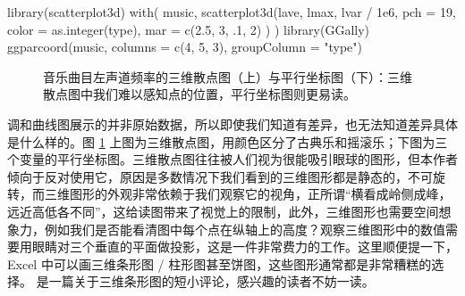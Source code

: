 \documentclass[
  b5paper,
  UTF8,twoside]{book}
\newenvironment{Shaded}{\begin{snugshade}}{\end{snugshade}}
\newcommand{\AttributeTok}[1]{\textcolor[rgb]{0.77,0.63,0.00}{#1}}
\newcommand{\DecValTok}[1]{\textcolor[rgb]{0.00,0.00,0.81}{#1}}
\newcommand{\FloatTok}[1]{\textcolor[rgb]{0.00,0.00,0.81}{#1}}
\newcommand{\FunctionTok}[1]{\textcolor[rgb]{0.00,0.00,0.00}{#1}}
\newcommand{\NormalTok}[1]{#1}
\newcommand{\SpecialCharTok}[1]{\textcolor[rgb]{0.00,0.00,0.00}{#1}}
\newcommand{\StringTok}[1]{\textcolor[rgb]{0.31,0.60,0.02}{#1}}
\begin{document}
\begin{Shaded}
\begin{Highlighting}[]
\FunctionTok{library}\NormalTok{(scatterplot3d)}
\FunctionTok{with}\NormalTok{(}
\NormalTok{  music,}
  \FunctionTok{scatterplot3d}\NormalTok{(lave, lmax, lvar }\SpecialCharTok{/} \FloatTok{1e6}\NormalTok{,}
    \AttributeTok{pch =} \DecValTok{19}\NormalTok{,}
    \AttributeTok{color =} \FunctionTok{as.integer}\NormalTok{(type), }\AttributeTok{mar =} \FunctionTok{c}\NormalTok{(}\FloatTok{2.5}\NormalTok{, }\DecValTok{3}\NormalTok{, .}\DecValTok{1}\NormalTok{, }\DecValTok{2}\NormalTok{)}
\NormalTok{  )}
\NormalTok{)}
\FunctionTok{library}\NormalTok{(GGally)}
\FunctionTok{ggparcoord}\NormalTok{(music, }\AttributeTok{columns =} \FunctionTok{c}\NormalTok{(}\DecValTok{4}\NormalTok{, }\DecValTok{5}\NormalTok{, }\DecValTok{3}\NormalTok{), }\AttributeTok{groupColumn =} \StringTok{"type"}\NormalTok{)}
\end{Highlighting}
\end{Shaded}

\begin{figure}

{\centering {}\newline{}

}

\caption[ 音乐曲目左声道频率的三维散点图与平行坐标图 ]{音乐曲目左声道频率的三维散点图（上）与平行坐标图（下）：三维散点图中我们难以感知点的位置，平行坐标图则更易读。}\label{fig:music-3d-pcp}
\end{figure}



调和曲线图展示的并非原始数据，所以即使我们知道有差异，也无法知道差异具体是什么样的。图 \ref{fig:music-3d-pcp} 上图为三维散点图，用颜色区分了古典乐和摇滚乐；下图为三个变量的平行坐标图。三维散点图往往被人们视为很能吸引眼球的图形，但本作者倾向于反对使用它，原因是多数情况下我们看到的三维图形都是静态的，不可旋转，而三维图形的外观非常依赖于我们观察它的视角，正所谓``横看成岭侧成峰，远近高低各不同''，这给读图带来了视觉上的限制，此外，三维图形也需要空间想象力，例如我们是否能看清图中每个点在纵轴上的高度？观察三维图形中的数值需要用眼睛对三个垂直的平面做投影，这是一件非常费力的工作。这里顺便提一下，Excel 中可以画三维条形图 / 柱形图甚至饼图，这些图形通常都是非常糟糕的选择。\citet{Krause09} 是一篇关于三维条形图的短小评论，感兴趣的读者不妨一读。
\end{document}
